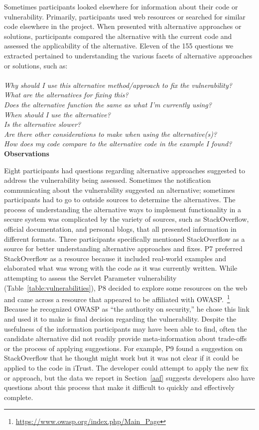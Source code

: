 \documentclass[conference]{IEEEtran}
\begin{document}
Sometimes participants looked elsewhere for information about their code or vulnerability. 
Primarily, participants used web resources or searched for similar code elsewhere in the project.
When presented with alternative approaches or solutions, participants compared the alternative with the current code and assessed the applicability of the alternative. 
Eleven of the 155 questions we extracted pertained to understanding the various facets of alternative approaches or solutions, such as:
\\
\\
\noindent\emph{Why should I use this alternative method/approach to fix the vulnerability?} \\
\emph{What are the alternatives for fixing this?} \\
\emph{Does the alternative function the same as what I'm currently using?} \\
\emph{When should I use the alternative?} \\
\emph{Is the alternative slower?} \\
\emph{Are there other considerations to make when using the alternative(s)?} \\
\emph{How does my code compare to the alternative code in the example I found?}
\\

\noindent\textbf{Observations}

Eight participants had questions regarding alternative approaches suggested to address the vulnerability being assessed. Sometimes the notification communicating about the vulnerability suggested an alternative; sometimes participants had to go to outside sources to determine the alternatives.
The process of understanding the alternative ways to implement functionality in a secure system was complicated by the variety of sources, such as StackOverflow, official documentation, and personal blogs, that all presented information in different formats. Three participants specifically mentioned StackOverflow as a source for better understanding alternative approaches and fixes. 
P7 preferred StackOverflow as a resource because it included real-world examples and elaborated what was wrong with the code as it was currently written.  
While attempting to assess the Servlet Parameter vulnerability (Table~\ref{table:vulnerabilities}), P8 decided to explore some resources on the web and came across a resource that appeared to be affiliated with OWASP.~\footnote{\url{https://www.owasp.org/index.php/Main_Page}} 
Because he recognized OWASP as ``the authority on security,'' he chose this link and used it to make is final decision regarding the vulnerability. 
Despite the usefulness of the information participants may have been able to find, often the candidate alternative did not readily provide meta-information about trade-offs or the process of applying suggestions. 
For example, P9 found a suggestion on StackOverflow that he thought might work but it was not clear if it could be applied to the code in iTrust. 
The developer could attempt to apply the new fix or approach, but the data we report in Section~\ref{aaf} suggests developers also have questions about this process that make it difficult to quickly and effectively complete.
\\
\end{document}
